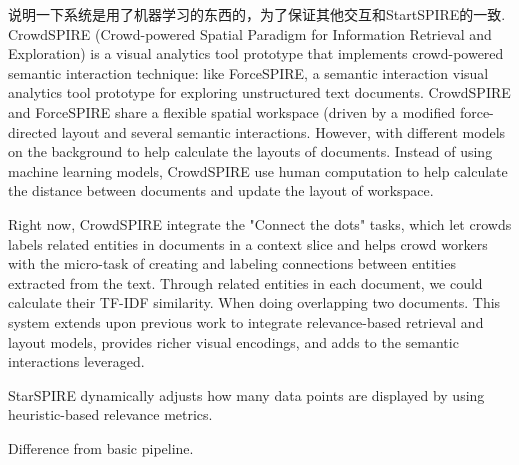 \documentclass[journal]{vgtc}                %
\begin{document}
说明一下系统是用了机器学习的东西的，为了保证其他交互和StartSPIRE的一致.
CrowdSPIRE (Crowd-powered Spatial Paradigm for Information Retrieval and Exploration) is a visual analytics tool prototype that implements crowd-powered semantic interaction technique: like ForceSPIRE, a semantic interaction visual analytics tool prototype for exploring unstructured text documents.
CrowdSPIRE and ForceSPIRE share a flexible spatial workspace (driven by a modified force-directed layout and several semantic interactions.
However, with different models on the background to help calculate the layouts of documents.
Instead of using machine learning models, CrowdSPIRE use human computation to help calculate the distance between documents and update the layout of workspace.

Right now, CrowdSPIRE integrate the "Connect the dots" tasks, which let crowds labels related entities in documents in a context slice and helps crowd workers with the micro-task of creating and labeling connections between entities extracted from the text.
Through related entities in each document, we could calculate their TF-IDF similarity. When doing overlapping two documents.
This system extends upon previous work to integrate relevance-based retrieval and layout models, provides richer visual encodings, and adds to the semantic interactions leveraged.

StarSPIRE dynamically adjusts how many data points are displayed by using heuristic-based relevance metrics.

Difference from basic pipeline.

\end{document}
